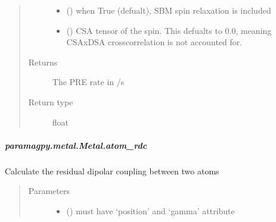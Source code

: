 \documentclass[a4paper,10pt,english]{sphinxmanual}
\begin{document}
\begin{fulllineitems}
\begin{fulllineitems}
\begin{fulllineitems}
\begin{quote}
\begin{description}
\begin{itemize}
\item {} 
 (\sphinxstyleliteralemphasis{\sphinxupquote{ (}}\sphinxstyleliteralemphasis{\sphinxupquote{)}}) \textendash{} when True (defualt), SBM spin relaxation is included

\item {} 
 (\sphinxstyleliteralemphasis{\sphinxupquote{ (}}\sphinxstyleliteralemphasis{\sphinxupquote{,}}\sphinxstyleliteralemphasis{\sphinxupquote{) }}\sphinxstyleliteralemphasis{\sphinxupquote{(}}\sphinxstyleliteralemphasis{\sphinxupquote{)}}) \textendash{} CSA tensor of the spin.
This defualts to 0.0, meaning CSAxDSA crosscorrelation is
not accounted for.

\end{itemize}

\item[{Returns}] \leavevmode
{} \textendash{} The PRE rate in /s

\item[{Return type}] \leavevmode
float

\end{description}\end{quote}

\end{fulllineitems}



\subparagraph{paramagpy.metal.Metal.atom\_rdc}
\label{\detokenize{reference/generated/paramagpy.metal.Metal.atom_rdc:paramagpy-metal-metal-atom-rdc}}\label{\detokenize{reference/generated/paramagpy.metal.Metal.atom_rdc::doc}}

\begin{fulllineitems}
\label{\detokenize{reference/generated/paramagpy.metal.Metal.atom_rdc:paramagpy.metal.Metal.atom_rdc}}
Calculate the residual dipolar coupling between two atoms
\begin{quote}\begin{description}
\item[{Parameters}] \leavevmode\begin{itemize}
\item {} 
 () \textendash{} must have ‘position’ and ‘gamma’ attribute


\end{itemize}
\end{description}
\end{quote}
\end{fulllineitems}
\end{fulllineitems}
\end{fulllineitems}
\end{document}

